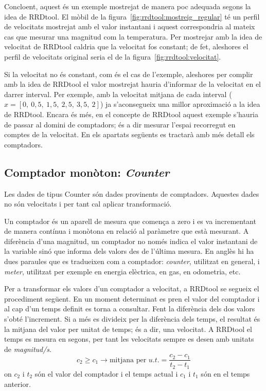 Concloent, aquest és un exemple mostrejat de manera poc adequada  segons la idea de RRDtool. El mòbil de la figura~\ref{fig:rrdtool:mostreig_regular} té un perfil de velocitats mostrejat amb el valor instantani i aquest correspondria al mateix cas que mesurar una magnitud com la temperatura. Per mostrejar amb la idea de velocitat de RRDtool caldria que la velocitat fos constant; de fet, aleshores el perfil de velocitats original seria el de la figura~\ref{fig:rrdtool:velocitat}.

Si la velocitat no és constant, com és el cas de l'exemple, aleshores per complir amb la idea de RRDtool el valor mostrejat hauria d'informar de la velocitat en el darrer interval. Per exemple, amb la velocitat mitjana de cada interval ($x=[0,\ 0{,}5,\ 1{,}5,\ 2{,}5,\ 3{,}5 ,\ 2]$) ja s'aconsegueix una millor aproximació a la idea de RRDtool. Encara és més, en el concepte de RRDtool aquest exemple s'hauria de passar al domini de comptadors; és a dir mesurar l'espai recorregut en comptes de la velocitat. En els apartats següents es tractarà amb més detall els comptadors.


\subsection{Comptador monòton: \emph{Counter}}

Les dades de tipus Counter són dades provinents de comptadors. Aquestes dades no són velocitats i per tant cal aplicar transformació. 

Un comptador és un aparell de mesura que comença a zero i es va incrementant de manera contínua i monòtona en relació al paràmetre que està mesurant. A diferència d'una magnitud, un comptador no només indica el valor instantani de la variable sinó que informa dels valors des de l'última mesura. En anglès hi ha dues paraules que es tradueixen com a comptador: \emph{counter}, utilitzat en general, i \emph{meter}, utilitzat per exemple en energia elèctrica, en gas, en odometria, etc.

Per a transformar els valors d'un comptador a velocitat, a RRDtool se segueix el procediment següent.
En un moment determinat es pren el valor del comptador i al cap d'un temps definit es torna a consultar. Fent la diferència dels dos valors s'obté l'increment. Si a més es divideix per la diferència dels temps, el resultat és la mitjana del valor per unitat de temps; és a dir, una velocitat. A RRDtool el temps es mesura en segons, per tant les velocitats sempre es desen amb unitats de \emph{magnitud/s}. 
\begin{equation}\label{eq:rrdtool:rate}
c_2 \geq c_1 \longrightarrow\text{mitjana per }u.t. =\frac{c_2-c_1}{t_2-t_1}
\end{equation}
on $c_2$ i $t_2$ són el valor del comptador i el temps actual  i $c_1$ i $t_1$ són en el temps anterior.

